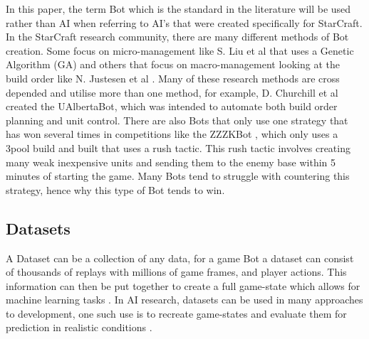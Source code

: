 \documentclass[journal]{IEEEtran}
\begin{document}
	In this paper, the term Bot which is the standard in the literature will be used rather than AI when referring to AI's that were created specifically for StarCraft. In the StarCraft research community, there are many different methods of Bot creation. Some focus on micro-management like S. Liu et al \cite{EffectiveMicro} that uses a Genetic Algorithm (GA) and others that focus on macro-management looking at the build order like N. Justesen et al \cite{OnlineEvo}. Many of these research methods are cross depended and utilise more than one method, for example, D. Churchill et al \cite{Agents} created the UAlbertaBot, which was intended to automate both build order planning and unit control. There are also Bots that only use one strategy that has won several times in competitions like the ZZZKBot \cite{ZZZK,Results}, which only uses a 3pool build and built that uses a rush tactic. This rush tactic involves creating many weak inexpensive units and sending them to the enemy base within 5 minutes of starting the game. Many Bots tend to struggle with countering this strategy, hence why this type of Bot tends to win.
	
	\subsection{Datasets}
	A Dataset can be a collection of any data, for a game Bot a dataset can consist of thousands of replays with millions of game frames, and player actions\cite{Dataset}. This information can then be put together to create a full game-state which allows for machine learning tasks \cite{Dataset17}. In AI research, datasets can be used in many approaches to development, one such use is to recreate game-states and evaluate them for prediction in realistic conditions \cite{SpecialTactics}.
	
\end{document}
